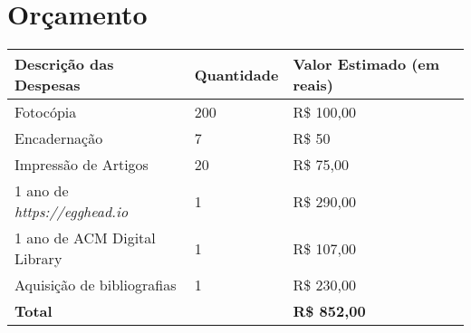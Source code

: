 \section{Orçamento}\label{lorcamento}

\begin{center}
  \tiny
  \begin{tabular}{| l | l | l | l |}
  \hline
  \textbf{Descrição das Despesas} & \textbf{Quantidade} & \textbf{Valor Estimado (em reais)} \\ \hline
  Fotocópia & 200 & R\$ 100,00 \\ \hline
  Encadernação & 7 & R\$ 50 \\ \hline
  Impressão de Artigos & 20 & R\$ 75,00 \\ \hline
  1 ano de \textit{https://egghead.io} & 1 & R\$ 290,00 \\ \hline
  1 ano de ACM Digital Library & 1 & R\$ 107,00 \\ \hline
  Aquisição de bibliografias & 1 & R\$ 230,00 \\
  \hline \hline
  \textbf{Total} & & \textbf{R\$ 852,00} \\
  \hline
  \end{tabular}
\end{center}
